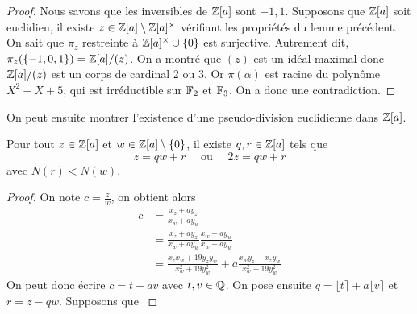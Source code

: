 \documentclass[../main.tex]{subfiles}
\begin{document}
\begin{proof}
    Nous savons que les inversibles de \(\mathbb{Z}[a]\) sont \(-1,1\). Supposons que \(\mathbb{Z}[a]\) soit euclidien, il existe \(z\in \mathbb{Z}[a]\setminus \mathbb{Z}[a]^\times\) vérifiant les propriétés du lemme précédent.
    On sait que \(\pi_z\) restreinte à \(\mathbb{Z}[a]^\times \cup \{0\}\) est surjective. Autrement dit, \(\pi_z(\{-1,0,1\}) = \mathbb{Z}[a]/(z)\). On a montré que \((z)\) 
    est un idéal maximal donc \(\mathbb{Z}[a]/(z)\) est un corps de cardinal 2 ou 3. Or \(\pi(\alpha)\) est racine du polynôme \(X^2 - X + 5\), qui est irréductible sur \(\mathbb{F}_2\) et \(\mathbb{F}_3\).
    On a donc une contradiction. 
\end{proof}
On peut ensuite montrer l'existence d'une pseudo-division euclidienne dans \(\mathbb{Z}[a]\).
\begin{proposition}
    Pour tout \(z\in\mathbb{Z}[a]\) et \(w\in\mathbb{Z}[a]\setminus\{0\}\), il existe \(q,r\in\mathbb{Z}[a]\) tels que
    \begin{equation}
        z = qw + r \quad\text{ ou }\quad 2z = qw + r
    \end{equation}
    avec \(N(r) < N(w)\).
\end{proposition}
\begin{proof}
    On note \(c = \frac{z}{w}\), on obtient alors
    \begin{align}
        c &= \frac{x_z + a y_z}{x_w + a y_w}\\
        & = \frac{x_z + a y_z}{x_w + a y_w}\frac{x_w - a y_w}{x_w - a y_w}\\
        & = \frac{x_z x_w + 19 y_z y_w}{x_w^2 + 19 y_w^2} + a\frac{x_w y_z - x_z y_w}{x_w^2 + 19 y_w^2}
    \end{align}
    On peut donc écrire \(c = t + av\) avec \(t,v\in\mathbb{Q}\). On pose ensuite \(q = \lfloor t \rceil + a\lfloor v \rceil\) et \(r = z - qw\). Supposons que \(\) 
\end{proof}
\end{document}
